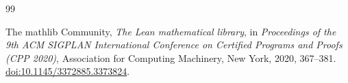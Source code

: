 \documentclass[11pt]{article}
\theoremstyle{definition}
\theoremstyle{remark}
\begin{document}
\begin{thebibliography}{99}

The mathlib Community,
\emph{The Lean mathematical library},
in \emph{Proceedings of the 9th ACM SIGPLAN International Conference on
Certified Programs and Proofs (CPP 2020)},
Association for Computing Machinery, New York, 2020, 367--381.
\href{https://doi.org/10.1145/3372885.3373824}{doi:10.1145/3372885.3373824}.

\end{thebibliography}
\end{document}
